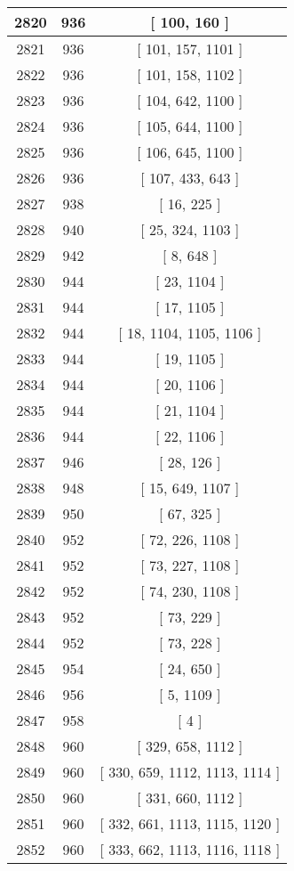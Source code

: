 \begin{center}
\begin{longtable}[H]{|| c c c ||}
\hline
2820 & 936 & [ 100, 160 ] \\ 
\hline
2821 & 936 & [ 101, 157, 1101 ] \\ 
\hline
2822 & 936 & [ 101, 158, 1102 ] \\ 
\hline
2823 & 936 & [ 104, 642, 1100 ] \\ 
\hline
2824 & 936 & [ 105, 644, 1100 ] \\ 
\hline
2825 & 936 & [ 106, 645, 1100 ] \\ 
\hline
2826 & 936 & [ 107, 433, 643 ] \\ 
\hline
2827 & 938 & [ 16, 225 ] \\ 
\hline
2828 & 940 & [ 25, 324, 1103 ] \\ 
\hline
2829 & 942 & [ 8, 648 ] \\ 
\hline
2830 & 944 & [ 23, 1104 ] \\ 
\hline
2831 & 944 & [ 17, 1105 ] \\ 
\hline
2832 & 944 & [ 18, 1104, 1105, 1106 ] \\ 
\hline
2833 & 944 & [ 19, 1105 ] \\ 
\hline
2834 & 944 & [ 20, 1106 ] \\ 
\hline
2835 & 944 & [ 21, 1104 ] \\ 
\hline
2836 & 944 & [ 22, 1106 ] \\ 
\hline
2837 & 946 & [ 28, 126 ] \\ 
\hline
2838 & 948 & [ 15, 649, 1107 ] \\ 
\hline
2839 & 950 & [ 67, 325 ] \\ 
\hline
2840 & 952 & [ 72, 226, 1108 ] \\ 
\hline
2841 & 952 & [ 73, 227, 1108 ] \\ 
\hline
2842 & 952 & [ 74, 230, 1108 ] \\ 
\hline
2843 & 952 & [ 73, 229 ] \\ 
\hline
2844 & 952 & [ 73, 228 ] \\ 
\hline
2845 & 954 & [ 24, 650 ] \\ 
\hline
2846 & 956 & [ 5, 1109 ] \\ 
\hline
2847 & 958 & [ 4 ] \\ 
\hline
2848 & 960 & [ 329, 658, 1112 ] \\ 
\hline
2849 & 960 & [ 330, 659, 1112, 1113, 1114 ] \\ 
\hline
2850 & 960 & [ 331, 660, 1112 ] \\ 
\hline
2851 & 960 & [ 332, 661, 1113, 1115, 1120 ] \\ 
\hline
2852 & 960 & [ 333, 662, 1113, 1116, 1118 ] \\ 

\end{longtable}
\end{center}
